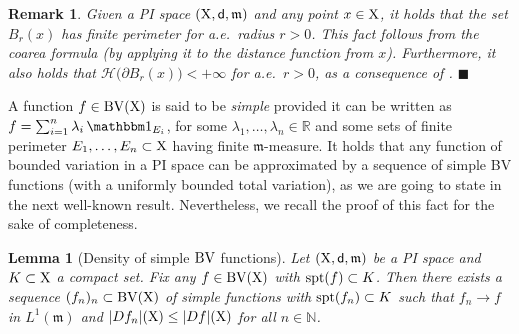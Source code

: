 \documentclass[reqno]{amsart}
\numberwithin{equation}{section}
\newcommand{\N}{\mathbb{N}}
\newcommand{\R}{\mathbb{R}}
\newcommand{\X}{{\rm X}}
\newcommand{\sfd}{{\sf d}}
\newcommand{\mm}{\mathfrak m}
\newcommand{\1}{\mathbbm 1}
\newcommand{\BV}{{\rm BV}}
\renewcommand{\H}{{\mathcal H}}
\newcommand{\fr}{\penalty-20\null\hfill\(\blacksquare\)}
\newtheorem{lemma}[theorem]{Lemma}
\newtheorem{remark}[theorem]{Remark}
\begin{document}
%
%
\begin{remark}\label{rmk:bdry_balls_finite_H}{\rm
Given a PI space \((\X,\sfd,\mm)\) and any point \(x\in\X\), it holds that
the set \(B_r(x)\) has finite perimeter for a.e.\ radius \(r>0\).
This fact follows from the coarea formula (by applying it to the
distance function from \(x\)). Furthermore, it also holds that
\(\H\big(\partial B_r(x)\big)<+\infty\) for a.e.\ \(r>0\),
as a consequence of \cite[Proposition 5.1]{Ambrosio02}.
\fr}\end{remark}
%
%
A function \(f\in\BV(\X)\) is said to be \emph{simple} provided it can be written
as \(f=\sum_{i=1}^n\lambda_i\,\1_{E_i}\), for some \(\lambda_1,\ldots,\lambda_n\in\R\)
and some sets of finite perimeter \(E_1,\ldots,E_n\subset\X\) having finite
\(\mm\)-measure. It holds that any function of bounded variation in a PI space
can be approximated by a sequence of simple BV functions (with a uniformly
bounded total variation), as we are going to state in the next well-known result.
Nevertheless, we recall the proof of this fact for the sake of completeness.
%
%
\begin{lemma}[Density of simple \(\BV\) functions]\label{lem:dens_simple}
Let \((\X,\sfd,\mm)\) be a PI space and \(K\subset\X\) a compact set.
Fix any \(f\in\BV(\X)\) with \({\rm spt}(f)\subset K\).
Then there exists a sequence \((f_n)_n\subset\BV(\X)\) of simple functions with
\({\rm spt}(f_n)\subset K\) such
that \(f_n\to f\) in \(L^1(\mm)\) and \(|Df_n|(\X)\leq|Df|(\X)\) for all \(n\in\N\).
\end{lemma}
\end{document}

